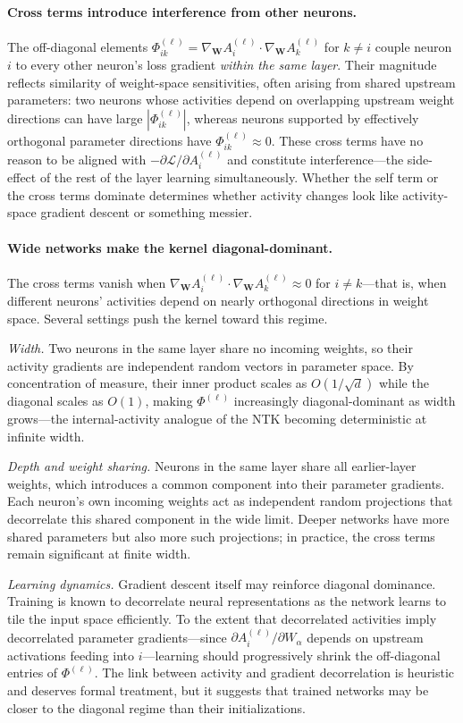 \documentclass[10pt]{article}
\newcommand{\vW}{\mathbf{W}}
\newcommand{\grad}{\nabla_{\!\vW}}
\newcommand{\loss}{\mathcal{L}}
\begin{document}
\paragraph{Cross terms introduce interference from other neurons.}
The off-diagonal elements $\Phi^{(\ell)}_{ik}=\grad A_i^{(\ell)}\cdot\grad A_k^{(\ell)}$ for $k\neq i$ couple neuron $i$ to every other neuron's loss gradient \emph{within the same layer}.  Their magnitude reflects similarity of weight-space sensitivities, often arising from shared upstream parameters: two neurons whose activities depend on overlapping upstream weight directions can have large $|\Phi^{(\ell)}_{ik}|$, whereas neurons supported by effectively orthogonal parameter directions have $\Phi^{(\ell)}_{ik}\approx 0$.  These cross terms have no reason to be aligned with $-\partial \loss/\partial A_i^{(\ell)}$ and constitute interference---the side-effect of the rest of the layer learning simultaneously.  Whether the self term or the cross terms dominate determines whether activity changes look like activity-space gradient descent or something messier.

\iffalse
\paragraph{Wide networks make the kernel diagonal-dominant.}
The cross terms vanish when $\grad A_i^{(\ell)} \cdot \grad A_k^{(\ell)} \approx 0$ for $i\neq k$---that is, when different neurons' activities depend on nearly orthogonal directions in weight space.  Several settings push the kernel toward this regime.

\emph{Width.}  Two neurons in the same layer share no incoming weights, so their activity gradients are independent random vectors in parameter space.  By concentration of measure, their inner product scales as $O(1/\sqrt{d})$ while the diagonal scales as $O(1)$, making $\Phi^{(\ell)}$ increasingly diagonal-dominant as width grows---the internal-activity analogue of the NTK becoming deterministic at infinite width.

\emph{Depth and weight sharing.}  Neurons in the same layer share all earlier-layer weights, which introduces a common component into their parameter gradients.  Each neuron's own incoming weights act as independent random projections that decorrelate this shared component in the wide limit.  Deeper networks have more shared parameters but also more such projections; in practice, the cross terms remain significant at finite width.

\emph{Learning dynamics.}  Gradient descent itself may reinforce diagonal dominance.  Training is known to decorrelate neural representations as the network learns to tile the input space efficiently.  To the extent that decorrelated activities imply decorrelated parameter gradients---since $\partial A_i^{(\ell)}/\partial W_\alpha$ depends on upstream activations feeding into $i$---learning should progressively shrink the off-diagonal entries of $\Phi^{(\ell)}$.  The link between activity and gradient decorrelation is heuristic and deserves formal treatment, but it suggests that trained networks may be closer to the diagonal regime than their initializations.
\end{document}
